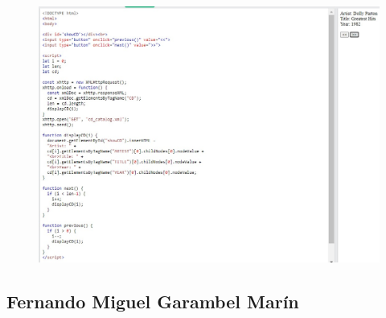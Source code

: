 \documentclass{article}
\begin{document}
\begin{itemize}
		\begin{figure}[H]
			\centering
			\includegraphics[width=1.0\textwidth,keepaspectratio]{img/A21.jpg}
		\end{figure}

	\end{itemize}

\subsection{Fernando Miguel Garambel Marín}
\end{document}
